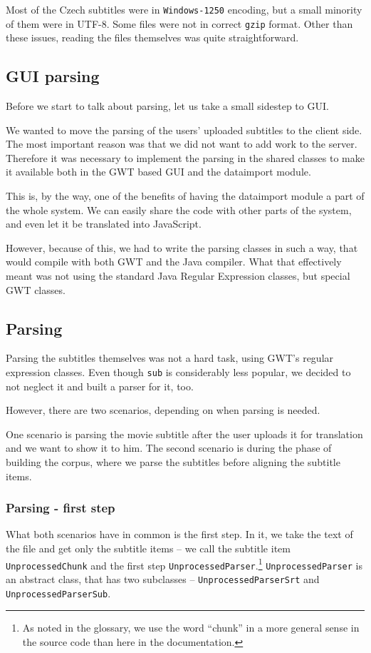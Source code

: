 Most of the Czech subtitles were in \texttt{Windows-1250} encoding, but a small minority of them were in UTF-8. Some files were not in correct \texttt{gzip} format. Other than these issues, reading the files themselves was quite straightforward.

\subsection*{GUI parsing}
Before we start to talk about parsing, let us take a small sidestep to GUI.

We wanted to move the parsing of the users' uploaded subtitles to the client side. The most important reason was that we did not want to add work to the server. Therefore it was necessary to implement the parsing in the shared classes to make it available both in the GWT based GUI and the dataimport module.

This is, by the way, one of the benefits of having the dataimport module a part of the whole system. We can easily share the code with other parts of the system, and even let it be translated into JavaScript.

However, because of this, we had to write the parsing classes in such a way, that would compile with both GWT and the Java compiler. What that effectively meant was not using the standard Java Regular Expression classes, but special GWT classes.

\subsection*{Parsing}
Parsing the subtitles themselves was not a hard task, using GWT's regular expression classes. Even though \texttt{sub} is considerably less popular, we decided to not neglect it and built a parser for it, too.

However, there are two scenarios, depending on when parsing is needed.

One scenario is parsing the movie subtitle after the user uploads it for translation and we want to show it to him. The second scenario is during the phase of building the corpus, where we parse the subtitles before aligning the subtitle items.

\subsubsection*{Parsing - first step}

What both scenarios have in common is the first step. In it, we take the text of the file and get only the subtitle items -- we call the subtitle item \texttt{UnprocessedChunk} and the first step \texttt{UnprocessedParser}.\footnote{As noted in the glossary, we use the word ``chunk'' in a more general sense in the source code than here in the documentation.} \texttt{UnprocessedParser} is an abstract class, that has two subclasses -- \texttt{UnprocessedParserSrt} and \texttt{UnprocessedParserSub}.

